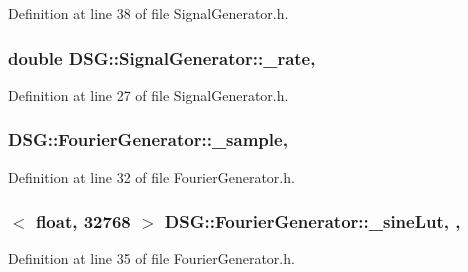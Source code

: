 Definition at line 38 of file Signal\+Generator.\+h.

\hypertarget{classDSG_1_1SignalGenerator_aa10f6c85d9adee901139ea7fb346f39d}{
\subsubsection[{\+\_\+rate}]{\setlength{\rightskip}{0pt plus 5cm}double D\+S\+G\+::\+Signal\+Generator\+::\+\_\+rate\hspace{0.3cm}{\ttfamily [protected]}, {\ttfamily [inherited]}}}\label{classDSG_1_1SignalGenerator_aa10f6c85d9adee901139ea7fb346f39d}


Definition at line 27 of file Signal\+Generator.\+h.

\hypertarget{classDSG_1_1FourierGenerator_ab96bed1cd59c42e82a689036e5c62bef}{
\subsubsection[{\+\_\+sample}]{ D\+S\+G\+::\+Fourier\+Generator\+::\+\_\+sample\hspace{0.3cm}{\ttfamily [protected]}, {\ttfamily [inherited]}}}\label{classDSG_1_1FourierGenerator_ab96bed1cd59c42e82a689036e5c62bef}


Definition at line 32 of file Fourier\+Generator.\+h.

\hypertarget{classDSG_1_1FourierGenerator_a1ae5fb243ce05e638bdf0dec8bde7426}{
\subsubsection[{\+\_\+sine\+Lut}]{$<$ float, 32768 $>$ D\+S\+G\+::\+Fourier\+Generator\+::\+\_\+sine\+Lut\hspace{0.3cm}{\ttfamily [static]}, {\ttfamily [protected]}, {\ttfamily [inherited]}}}\label{classDSG_1_1FourierGenerator_a1ae5fb243ce05e638bdf0dec8bde7426}


Definition at line 35 of file Fourier\+Generator.\+h.

